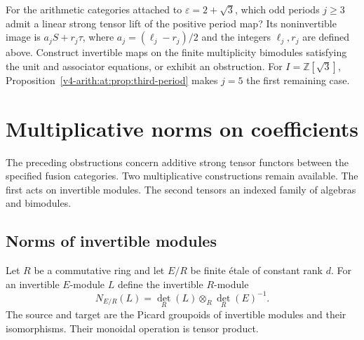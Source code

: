 \begin{question}\label{v4-arith:at:qn:tensorator}

For the arithmetic categories attached to $\varepsilon=2+\sqrt3$, which odd periods $j\ge3$ admit a
linear strong tensor lift of the positive period map? Its noninvertible image is
$a_jS+r_j\tau$, where $a_j=(\ell_j-r_j)/2$ and the integers $\ell_j,r_j$ are defined above.
Construct invertible maps on the finite multiplicity bimodules satisfying the unit and
associator equations, or exhibit an obstruction. For $I=\mathbb Z[\sqrt3]$,
Proposition~\ref{v4-arith:at:prop:third-period} makes $j=5$ the first remaining case.
\end{question}



\section{Multiplicative norms on coefficients}

The preceding obstructions concern additive strong tensor
functors between the specified fusion categories.
Two multiplicative constructions remain available.
The first acts on invertible modules.
The second tensors an indexed family of algebras and bimodules.

\subsection{Norms of invertible modules}

Let \(R\) be a commutative ring and let \(E/R\) be finite \'etale
of constant rank \(d\). For an invertible
$E$-module $L$ define the invertible $R$-module
\begin{equation}\label{v4-arith:at:eq:norm}
 N_{E/R}(L)=\det_R(L)\otimes_R\det_R(E)^{-1}.
\end{equation}
The source and target are the Picard groupoids of invertible
modules and their isomorphisms. Their monoidal operation is
tensor product.

